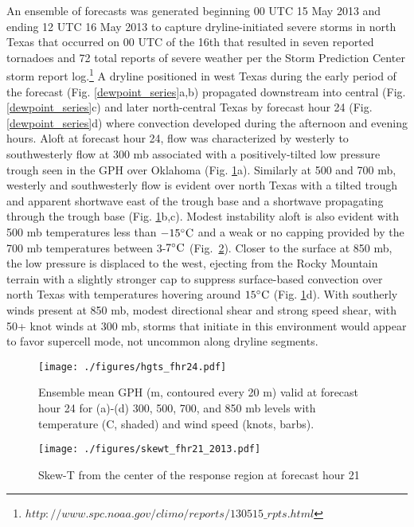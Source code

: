 \documentclass{ttuthes2007}
\newcommand{\tab}{\hspace*{2em}}  %
\begin{document}
\tab An ensemble of forecasts was generated beginning 00 UTC 15 May 2013 and ending 12 UTC 16 May 2013 to capture dryline-initiated severe storms in north Texas that occurred on 00 UTC of the 16th that resulted in seven reported tornadoes and 72 total reports of severe weather per the Storm Prediction Center storm report log.\footnote{$http://www.spc.noaa.gov/climo/reports/130515\_rpts.html$} A dryline positioned in west Texas during the early period of the forecast (Fig. \ref{dewpoint_series}a,b) propagated downstream into central (Fig. \ref{dewpoint_series}c) and later north-central Texas by forecast hour 24 (Fig. \ref{dewpoint_series}d) where convection developed during the afternoon and evening hours. Aloft at forecast hour 24, flow was characterized by westerly to southwesterly flow at 300 mb associated with a positively-tilted low pressure trough seen in the GPH over Oklahoma (Fig. \ref{hgts_fhr24}a). Similarly at 500 and 700 mb, westerly and southwesterly flow is evident over north Texas with a tilted trough and apparent shortwave east of the trough base and a shortwave propagating through the trough base (Fig. \ref{hgts_fhr24}b,c). Modest instability aloft is also evident with 500 mb temperatures less than $-15^{\circ} {\rm C}$ and a weak or no capping provided by the 700 mb temperatures between 3-$7^{\circ}{\rm C}$ (Fig.~\ref{skewt_2013}). Closer to the surface at 850 mb, the low pressure is displaced to the west, ejecting from the Rocky Mountain terrain with a slightly stronger cap to suppress surface-based convection over north Texas with temperatures hovering around $15^{\circ} {\rm C}$ (Fig. \ref{hgts_fhr24}d). With southerly winds present at 850 mb, modest directional shear and strong speed shear, with 50+ knot winds at 300 mb, storms that initiate in this environment would appear to favor supercell mode, not uncommon along dryline segments. 

\begin{figure}[!bt]
  \centering
  \noindent\texttt{[image: ./figures/hgts\_fhr24.pdf]}\\
  \caption{Ensemble mean GPH (m, contoured every 20 m) valid at forecast hour 24 for (a)-(d) 300, 500, 700, and 850 mb levels with temperature (C, shaded) and wind speed (knots, barbs).}
\label{hgts_fhr24}
\end{figure}

\begin{figure}[!tb]
  \centering
  \noindent\texttt{[image: ./figures/skewt\_fhr21\_2013.pdf]}\\
  \caption{Skew-T from the center of the response region at forecast hour 21}
\label{skewt_2013}
\end{figure}
\end{document}
